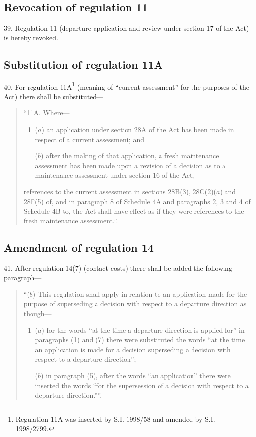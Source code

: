 \documentclass[12pt,a4paper]{article}
\begin{document}
\subsection[39. Revocation of regulation 11]{Revocation of regulation 11}

39.  Regulation 11 (departure application and review under section 17 of the Act) is hereby revoked.

\subsection[40. Substitution of regulation 11A]{Substitution of regulation 11A}

40.  For regulation 11A\footnote{\frenchspacing Regulation 11A was inserted by S.I. 1998/58 and amended by S.I. 1998/2799.} (meaning of “current assessment” for the purposes of the Act) there shall be substituted---
\begin{quotation}
“11A.  Where---
\begin{enumerate}\item[]
($a$) an application under section 28A of the Act has been made in respect of a current assessment; and

($b$) after the making of that application, a fresh maintenance assessment has been made upon a revision of a decision as to a maintenance assessment under section 16 of the Act,
\end{enumerate}
references to the current assessment in sections 28B(3), 28C(2)($a$) and 28F(5) of, and in paragraph 8 of Schedule 4A and paragraphs 2, 3 and 4 of Schedule 4B to, the Act shall have effect as if they were references to the fresh maintenance assessment.”.
\end{quotation}

\subsection[41. Amendment of regulation 14]{Amendment of regulation 14}

41.  After regulation 14(7) (contact costs) there shall be added the following paragraph---
\begin{quotation}
“(8) This regulation shall apply in relation to an application made for the purpose of superseding a decision with respect to a departure direction as though---
\begin{enumerate}\item[]
($a$) for the words “at the time a departure direction is applied for” in paragraphs (1) and (7) there were substituted the words “at the time an application is made for a decision superseding a decision with respect to a departure direction”;

($b$) in paragraph (5), after the words “an application” there were inserted the words “for the supersession of a decision with respect to a departure direction.””.
\end{enumerate}
\end{quotation}
\end{document}
